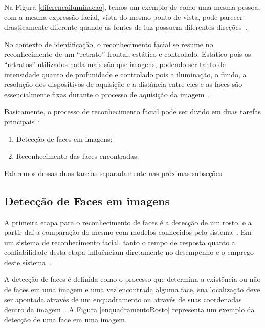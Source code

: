 Na Figura \ref{diferencailuminacao}, temos um exemplo de como uma mesma pessoa, com a mesma expressão facial, vista do mesmo ponto de vista, pode parecer drasticamente diferente quando as fontes de luz possuem diferentes direções~\cite{belhumeur}.

No contexto de identificação, o reconhecimento facial se resume no reconhecimento de um ``retrato'' frontal, estático e controlado. Estático pois os ``retratos'' utilizados nada mais são que imagens, podendo ser tanto de intensidade quanto de profunidade e controlado pois a iluminação, o fundo, a resolução dos dispositivos de aquisição e a distância entre eles e as faces são essencialmente fixas durante o processo de aquisição da imagem~\cite{hong}.

Basicamente, o processo de reconhecimento facial pode ser divido em duas tarefas principais~\cite{hong}:

	\begin{enumerate}
		\item Detecção de faces em imagens;
		\item Reconhecimento das faces encontradas;
	\end{enumerate}

Falaremos dessas duas tarefas separadamente nas próximas subseções.


\subsection{Detecção de Faces em imagens}
	
A primeira etapa para o reconhecimento de faces é a detecção de um rosto, e a partir daí a comparação do mesmo com modelos conhecidos pelo sistema~\cite{hong, oliveira}. Em um sistema de reconhecimento facial, tanto o tempo de resposta quanto a confiabilidade desta etapa influênciam diretamente no desempenho e o emprego deste sistema~\cite{oliveira}.

A detecção de faces é definida como o processo que determina a existência ou não de faces em uma imagem e uma vez encontrada alguma face, sua localização deve ser apontada através de um enquadramento ou através de suas coordenadas dentro da imagem~\cite{oliveira}. A Figura \ref{enquadramentoRosto} representa um exemplo da detecção de uma face em uma imagem.

